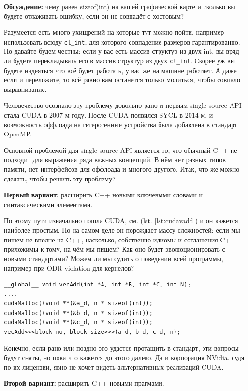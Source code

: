 \documentclass[a4paper,12pt,oneside]{article}
\begin{document}
\textbf{Обсуждение:} чему равен sizeof(int) на вашей графической карте и сколько вы будете отлаживать ошибку, если он не совпадёт с хостовым?

Разумеется есть много ухищрений на которые тут можно пойти, например использовать всюду \lstinline!cl_int!, для которого совпадение размеров гарантированно.
Но давайте будем честны: если у вас есть массив структур из двух int, вы вряд ли будете перекладывать его в массив структур из двух \lstinline!cl_int!.
Скорее уж вы будете надеяться что всё будет работать, у вас же на машине работает.
А даже если и переложите, то всё равно вам останется только молиться, чтобы совпало выравнивание.

Человечество осознало эту проблему довольно рано и первым single-source API стала CUDA в 2007-м году. После CUDA появился SYCL в 2014-м, и возможность оффлоада на гетерогенные устройства была добавлена в стандарт OpenMP.

Основной проблемой для single-source API является то, что обычный C++ не подходит для выражения ряда важных концепций. В нём нет разных типов памяти, нет интерфейсов для оффлоада и многого другого. Итак, что же можно сделать, чтобы решить эту проблему?

\textbf{Первый вариант:} расширить C++ новыми ключевыми словами и синтаксическими элементами. 

По этому пути изначально пошла CUDA, см. (lst. \ref{lst:cudavadd}) и он кажется наиболее простым.
Но на самом деле он порождает массу сложностей: если мы пишем не вполне на C++, насколько, собственно идиомы и соглашения C++ приложимы к тому, на чём мы пишем?
Как оно будет эволюционировать с новыми стандартами?
Можем ли мы судить о поведении всей программы, например при ODR violation для кернелов?

\begin{lstlisting}[caption={Векторное сложение, CUDA},label={lst:cudavadd}]
__global__ void vecAdd(int *A, int *B, int *C, int N);
....
cudaMalloc((void **)&a_d, n * sizeof(int));
cudaMalloc((void **)&b_d, n * sizeof(int));
cudaMalloc((void **)&c_d, n * sizeof(int));
vecAdd<<<block_no, block_size>>>(a_d, b_d, c_d, n);
\end{lstlisting}

Конечно, если рано или поздно это удастся протащить в стандарт, эти вопросы будут сняты, но пока что кажется до этого далеко.
Да и корпорация NVidia, судя по их лицензии, явно не хочет видеть альтернативных реализаций CUDA.

\textbf{Второй вариант:} расширить C++ новыми прагмами.
\end{document}
